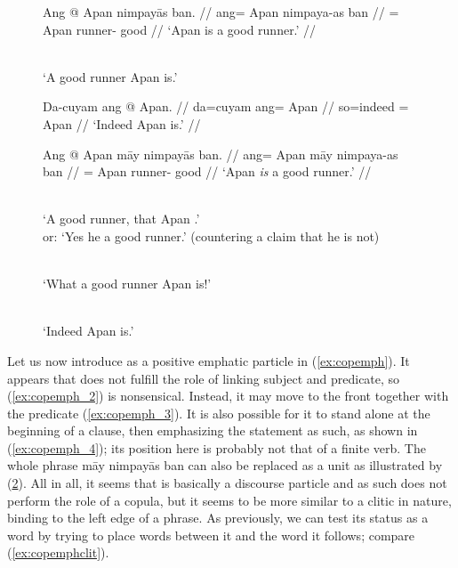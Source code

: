 \begin{figure}
\pex\label{ex:copnoemph}
\a\label{ex:copnoemph_1}\begingl
	\gla Ang @ Apan nimpayās ban. //
	\glb ang= Apan nimpaya-as ban //
	\glc \Aarg{}= Apan runner-\Parg{} good //
	\glft `Apan is a good runner.' //
\endgl

\a\label{ex:copnoemph_2}%
	 \\
	`A good runner Apan is.'

\a\label{ex:copnoemph_3}\begingl
	\gla Da-cuyam ang @ Apan. //
	\glb da=cuyam ang= Apan //
	\glc so=indeed \Aarg{}= Apan //
	\glft `Indeed Apan is.' //
\endgl
\xe
\end{figure}

\begin{figure}
\pex\label{ex:copemph}
\a\label{ex:copemph_1}\begingl
	\gla Ang @ Apan māy nimpayās ban. //
	\glb ang= Apan māy nimpaya-as ban //
	\glc \Aarg{}= Apan \Int{} runner-\Parg{} good //
	\glft `Apan \emph{is} a good runner.' //
\endgl

\a\label{ex:copemph_2}%
	\ljudge*{}

\a\label{ex:copemph_3}%
	 \\
	`A good runner, that Apan .'\\
	or: `Yes he  a good runner.' (countering a claim that he is not)

\a\label{ex:copemph_4}%
	 \\
	`What a good runner Apan is!'

\a\label{ex:copemph_5}%
	 \\
	`Indeed Apan is.'
\xe
\end{figure}

Let us now introduce  as a positive emphatic particle in
(\ref{ex:copemph}). It appears that  does not fulfill the role
of linking subject and predicate, so (\ref{ex:copemph_2}) is nonsensical.
Instead, it may move to the front together with the predicate
(\ref{ex:copemph_3}). It is also possible for it to stand alone at the
beginning of a clause, then emphasizing the statement as such, as shown in
(\ref{ex:copemph_4}); its position here is probably not that of a finite verb.
The whole phrase  {māy nimpayās ban} can also be
replaced as a unit as illustrated by (\ref{ex:copemph_5}). All in all, it seems
that  is basically a discourse particle and as such does not
perform the role of a copula, but it seems to be more similar to a clitic in
nature, binding to the left edge of a phrase. As previously, we can test its
status as a word by trying to place words between it and the word it follows;
compare (\ref{ex:copemphclit}).

